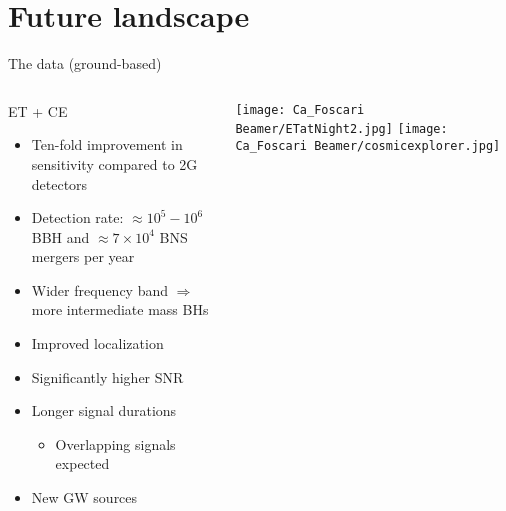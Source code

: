 \documentclass[aspectratio=169, 11pt]{beamer}
\def \bblock{\begin{beamerboxesrounded}[upper=uppercolor,lower=lowercolor,shadow=true]}
\def \eblock{\end{beamerboxesrounded}}
\begin{document}
\section{Future landscape}

\begin{frame}{The data (ground-based)}
\begin{columns}
     \vspace{1cm}
    \bblock{\centering ET + CE}
    \begin{itemize}
        \item Ten-fold improvement in sensitivity compared to 2G detectors
        \item Detection rate: $\approx 10^5-10^6$ BBH and $\approx 7 \times 10^4$ BNS mergers per year
        \item Wider frequency band $\Rightarrow$ more intermediate mass BHs
        \item Improved localization
        \item Significantly higher SNR
        \item Longer signal durations %
        \begin{itemize}
            \item Overlapping signals expected
        \end{itemize}
        \item New GW sources
    \end{itemize}
    \eblock

    \vspace{1cm}
    \centering
    \texttt{[image: Ca\_Foscari Beamer/ETatNight2.jpg]}
    \texttt{[image: Ca\_Foscari Beamer/cosmicexplorer.jpg]}
    
\end{columns}
\end{frame}
\end{document}
